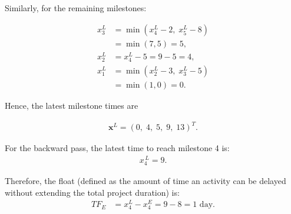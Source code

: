 \begin{enumerate}[label=\thesubsection.\arabic*, ref=\thesubsection.\theenumi,itemsep=0pt]
Similarly, for the remaining milestones:

\begin{align*}
x_3^L &= \min(x_4^L-2,\;x_5^L-8)\\
      &=\min(7,5)=5,\\[6pt]
x_2^L &=x_4^L-5=9-5=4,\\[6pt]
x_1^L &=\min(x_2^L-3,\;x_3^L-5)\\
      &=\min(1,0)=0.
\end{align*}

Hence, the latest milestone times are

\begin{align}
\mathbf{x}^L=(0,\;4,\;5,\;9,\;13)^T.
\end{align}


For the backward pass, the latest time to reach milestone 4 is:
\begin{align}
x_4^{\,L}=9.
\end{align}


Therefore, the float (defined as the amount of time an activity can be delayed without extending the total project duration) is:
\begin{align}
TF_E
&=x_4^L-x_4^E=9-8=1\text{ day}.
\end{align}


\end{enumerate}

